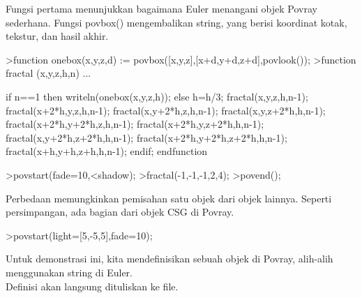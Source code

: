 \documentclass{article}
\begin{document}
\begin{eulernotebook}
\begin{eulercomment}
Fungsi pertama menunjukkan bagaimana Euler menangani objek Povray
sederhana. Fungsi povbox() mengembalikan string, yang berisi koordinat
kotak, tekstur, dan hasil akhir.
\end{eulercomment}
\begin{eulerprompt}
>function onebox(x,y,z,d) := povbox([x,y,z],[x+d,y+d,z+d],povlook());
>function fractal (x,y,z,h,n) ...
\end{eulerprompt}
\begin{eulerudf}
   if n==1 then writeln(onebox(x,y,z,h));
   else
     h=h/3;
     fractal(x,y,z,h,n-1);
     fractal(x+2*h,y,z,h,n-1);
     fractal(x,y+2*h,z,h,n-1);
     fractal(x,y,z+2*h,h,n-1);
     fractal(x+2*h,y+2*h,z,h,n-1);
     fractal(x+2*h,y,z+2*h,h,n-1);
     fractal(x,y+2*h,z+2*h,h,n-1);
     fractal(x+2*h,y+2*h,z+2*h,h,n-1);
     fractal(x+h,y+h,z+h,h,n-1);
   endif;
  endfunction
\end{eulerudf}
\begin{eulerprompt}
>povstart(fade=10,<shadow);
>fractal(-1,-1,-1,2,4);
>povend();
\end{eulerprompt}
\begin{eulercomment}
Perbedaan memungkinkan pemisahan satu objek dari objek lainnya.
Seperti persimpangan, ada bagian dari objek CSG di Povray.
\end{eulercomment}
\begin{eulerprompt}
>povstart(light=[5,-5,5],fade=10);
\end{eulerprompt}
\begin{eulercomment}
Untuk demonstrasi ini, kita mendefinisikan sebuah objek di Povray,
alih-alih menggunakan string di Euler.\\
Definisi akan langsung dituliskan ke file.


\end{eulercomment}
\end{eulernotebook}
\end{document}
